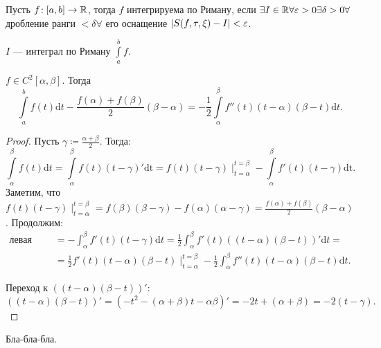 \begin{definition}
    Пусть $f\!: [a, b] \to \mathbb{R}$, тогда $f$  интегрируема по Риману, если $\exists I \in \mathbb{R} \forall \varepsilon > 0 \exists \delta > 0 \forall$ дробление ранги  $< \delta \forall$ его оснащение  $|S(f, \tau, \xi) - I| < \varepsilon$. 

     $I$ --- интеграл по Риману  $\int\limits_a^b f$.
\end{definition}
\begin{lemma}
    $f \in C^2[\alpha, \beta]$. Тогда  \[\int\limits_a^b f(t)\mathrm{d}t - \frac{f(\alpha) + f(\beta)}{2}(\beta - \alpha) = -\frac{1}{2} \int\limits_\alpha^\beta f''(t)(t-\alpha)(\beta-t)\mathrm{d}t.\]
\end{lemma}
\begin{proof}
    Пусть  $\gamma \coloneqq \frac{\alpha + \beta}{2}$. Тогда: \[
        \int\limits_\alpha^\beta f(t) \mathrm{d}t = \int\limits_\alpha^\beta f(t)(t-\gamma)' \mathrm{dt} = f(t)(t-\gamma)\mid_{t=\alpha}^{t=\beta} - \int\limits_\alpha^\beta f'(t)(t-\gamma)\mathrm{dt}
    .\] 
    Заметим, что $f(t)(t-\gamma)\mid_{t=\alpha}^{t=\beta} = f(\beta)(\beta - \gamma) - f(\alpha)(\alpha - \gamma) = \frac{f(\alpha) + f(\beta)}{2}(\beta - \alpha)$. Продолжим: \begin{align*}
        \text{левая часть} &= -\int_{\alpha}^\beta f'(t)(t-\gamma)\mathrm{d}t = \frac{1}{2}\int_\alpha^\beta f'(t)((t-\alpha)(\beta-t))' \mathrm{d}t = \\ &= \frac{1}{2}f'(t)(t-\alpha)(\beta - t)\mid_{t=\alpha}^{t=\beta} - \frac{1}{2} \int_\alpha^\beta f''(t)(t-\alpha)(\beta-t)\mathrm{d}t
    .\end{align*}

    Переход к $((t-\alpha)(\beta - t))'$: \[
        ((t-\alpha)(\beta - t))' = (-t^2 - (\alpha + \beta)t - \alpha\beta)' = -2t+(\alpha + \beta) = -2(t-\gamma)
    .\] 
\end{proof}
\begin{remark}
    Бла-бла-бла.
\end{remark}

